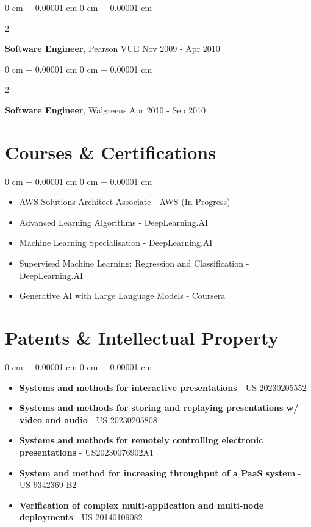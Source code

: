 \documentclass[10pt, letterpaper]{article}
\newenvironment{highlights}{
    \begin{itemize}[
        topsep=0.10 cm,
        parsep=0.10 cm,
        partopsep=0pt,
        itemsep=0pt,
        leftmargin=0 cm + 10pt
    ]
}{
    \end{itemize}
} %
\newenvironment{onecolentry}{
    \begin{adjustwidth}{
        0 cm + 0.00001 cm
    }{
        0 cm + 0.00001 cm
    }
}{
    \end{adjustwidth}
} %
\newenvironment{twocolentry}[2][]{
    \onecolentry
    \def\secondColumn{#2}
    \setcolumnwidth{\fill, 4.5 cm}
    \begin{paracol}{2}
}{
    \switchcolumn \raggedleft \secondColumn
    \end{paracol}
    \endonecolentry
} %
\begin{document}
        \vspace{0.10 cm}
        \begin{twocolentry}{
            Nov 2009 - Apr 2010
        }
            \textbf{Software Engineer}, Pearson VUE\end{twocolentry}

        \vspace{0.10 cm}
        \begin{twocolentry}{
            Apr 2010 - Sep 2010
        }
            \textbf{Software Engineer}, Walgreens\end{twocolentry}

        \section{Courses \& Certifications}
        \vspace{0.10 cm}
        \begin{onecolentry}
            \begin{highlights}
                \item AWS Solutions Architect Associate - AWS (In Progress)
                \item Advanced Learning Algorithms - DeepLearning.AI
                \item Machine Learning Specialisation - DeepLearning.AI
                \item Supervised Machine Learning: Regression and Classification - DeepLearning.AI
                \item Generative AI with Large Language Models - Coursera
            \end{highlights}
        \end{onecolentry}

        \section{Patents \& Intellectual Property}
        \vspace{0.10 cm}
        \begin{onecolentry}
            \begin{highlights}
                \item \textbf{Systems and methods for interactive presentations} - US 20230205552
                \item \textbf{Systems and methods for storing and replaying presentations w/ video and audio} - US 20230205808
                \item \textbf{Systems and methods for remotely controlling electronic presentations} - US20230076902A1
                \item \textbf{System and method for increasing throughput of a PaaS system} - US 9342369 B2
                \item \textbf{Verification of complex multi-application and multi-node deployments} - US 20140109082
            \end{highlights}
        \end{onecolentry}
\end{document}
